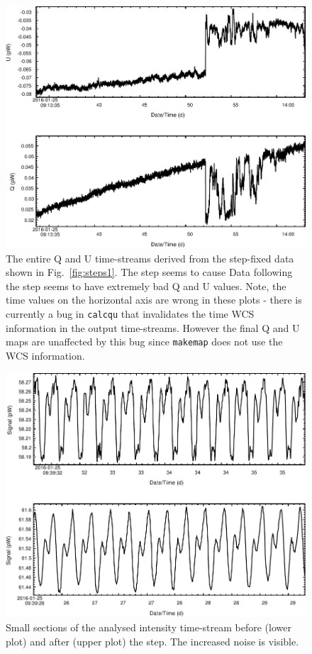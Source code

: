 \documentclass[twoside,11pt]{starlink}
\begin{document}
\begin{figure}
\includegraphics[width=\columnwidth]{steps2}
\caption{The entire Q and U time-streams derived from the step-fixed data
shown in Fig.~\ref{fig:steps1}. The step seems to cause Data following
the step seems to have extremely bad Q and U values. Note, the time values
on the horizontal
axis are wrong in these plots - there is currently a bug in \texttt{calcqu}
that invalidates the time WCS information in the output time-streams.
However the final Q and U maps are unaffected by this bug since
\texttt{makemap} does not use the WCS information.}
\label{fig:steps2}
\end{figure}

\begin{figure}
\includegraphics[width=\columnwidth]{steps3}
\caption{Small sections of the analysed intensity time-stream before
(lower plot) and after (upper plot) the step. The increased noise is
visible. }
\label{fig:steps3}
\end{figure}
\end{document}
